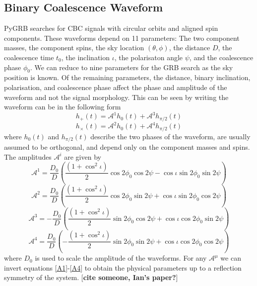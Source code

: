 \documentclass[11pt]{cuthesis}
\begin{document}
\subsection{Binary Coalescence Waveform} 
PyGRB searches for CBC signals with circular orbits and aligned spin components. These waveforms depend on 11 parameters: The two component masses, the component spins, the sky location $(\theta, \phi)$, the distance $D$, the coalescence time $t_0$, the inclination $\iota$, the polarisaton angle $\psi$, and the coalescence phase $\phi_0$. We can reduce to nine parameters for the GRB search as the sky position is known. Of the remaining parameters, the distance, binary inclination, polarisation, and coalescence phase affect the phase and amplitude of the waveform and not the signal morphology. This can be seen by writing the waveform can be in the following form
\begin{equation} \label{hp}
h_+(t) = \mathcal{A}^1 h_0(t) + \mathcal{A}^3 h_{\pi/2}(t)
\end{equation}
\begin{equation} \label{hx}
h_\times(t) = \mathcal{A}^2 h_0(t) + \mathcal{A}^4 h_{\pi/2}(t)
\end{equation}
where $h_0(t)$ and $h_{\pi/2}(t)$ describe the two phases of the waveform, are usually assumed to be orthogonal, and depend only on the component masses and spins. The amplitudes $\mathcal{A}^i$ are given by 
\begin{equation} \label{A1}
\mathcal{A}^1 = \frac{D_0}{D} \left( \frac{(1+\cos^2 \iota)}{2} \cos 2\phi_0 \cos 2\psi -  \cos \iota \sin 2 \phi_0 \sin 2\psi \right)
\end{equation}
\begin{equation}
\mathcal{A}^2 = \frac{D_0}{D} \left( \frac{(1+\cos^2 \iota)}{2} \cos 2\phi_0 \sin 2\psi +  \cos \iota \sin 2 \phi_0 \cos 2\psi \right)
\end{equation}
\begin{equation}
\mathcal{A}^3 = -\frac{D_0}{D} \left( \frac{(1+\cos^2 \iota)}{2} \sin 2\phi_0 \cos 2\psi +  \cos \iota \cos 2 \phi_0 \sin 2\psi \right)
\end{equation}
\begin{equation} \label{A4}
\mathcal{A}^4 = \frac{D_0}{D} \left( -\frac{(1+\cos^2 \iota)}{2} \sin 2\phi_0 \sin 2\psi +  \cos \iota \cos 2 \phi_0 \cos 2\psi \right)
\end{equation}
where $D_0$ is used to scale the amplitude of the waveforms. For any $\mathcal{A}^\mu$ we can invert equations \ref{A1}-\ref{A4} to obtain the physical parameters up to a reflection symmetry of the system. [\textbf{cite someone, Ian's  paper?}]
\end{document}
